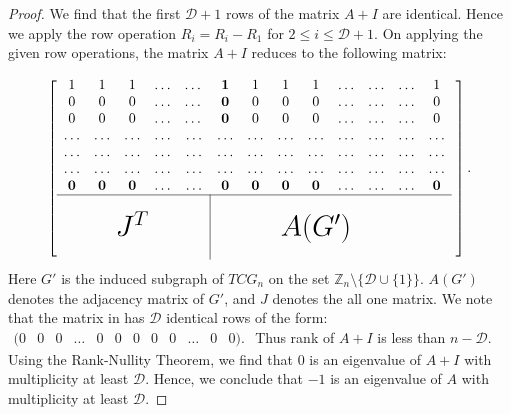 \documentclass[12pt]{article}
\begin{document}
\begin{proof}
		We find that the first $\mathcal{D}+1$ rows of the matrix $A+I$ are identical.
		Hence we apply the row operation $R_i=R_i-R_1$ for $2\le i\le \mathcal{D}+1$.
		On applying the given row operations, the matrix $A+I$ reduces to the following matrix:
		
		\begin{equation}
			\label{Eq2}
			\left[
			\begin{array}{cccccccccccccccccccccccccccccccccccccccccccccc}
				1 & 1 & 1& \ldots &\dots & \textbf{1}&1 & 1 & 1& \ldots&\ldots &\ldots& 1\\
				0 & 0 & 0& \ldots &\dots &\textbf{0}&0 & 0 & 0& \ldots &\ldots&\ldots& 0\\
				0& 0 & 0 &\ldots&\dots& \textbf{0}&0 & 0 & 0& \ldots &\ldots&\ldots& 0\\
				\ldots& \ldots &\ldots &\ldots&\ldots& \ldots &\ldots &\ldots&\ldots&\ldots&\ldots&\ldots&\ldots\\
				\ldots& \ldots &\ldots &\ldots&\ldots& \ldots &\ldots &\ldots&\ldots&\ldots&\ldots&\ldots&\ldots\\
				\ldots& \ldots &\ldots &\ldots&\ldots& \ldots &\ldots &\ldots&\ldots&\ldots&\ldots&\ldots&\ldots\\
				\textbf{0}& \textbf{0} &\textbf{0}&\ldots &\ldots& \textbf{0} &\textbf{0} & \textbf{0} & \textbf{0}& \ldots &\ldots&\ldots& \textbf{0}\\
				\cline{1-13}
				&   &                      &   & \multicolumn{1}{c|}{}  &   &                        \\
				&   & \makebox[0pt]{\huge{$J^T$}}    &   & \multicolumn{1}{c|}{}  &&   &&\makebox[0pt]{\huge{$A(G')$}}    \\
				&   &                      &   & \multicolumn{1}{c|}{}  &   &
			\end{array} \;
			\right].
		\end{equation}
		Here $G'$ is the induced subgraph of $TCG_n$ on the set $\mathbb Z_n\setminus \{\mathcal{D}\cup \{1\}\}.$ 
		$A(G')$ denotes the adjacency matrix of $G'$, and $J$ denotes the all one matrix.
		We note that the matrix in   has $\mathcal{D}$ identical rows of the form: 
		$\begin{array}{ccccccccccccccccc}
			(0 & 0 & 0 &\dots & 0 &0 &0&0&0&\dots&0 &0 ).
		\end{array}$
		Thus rank of $A+I$ is less than $n-\mathcal{D}$. Using the Rank-Nullity Theorem, we find that  $0$ is an eigenvalue of $A+I$ with multiplicity at least $\mathcal{D}$. Hence, we conclude that $-1$ is an eigenvalue of $A$ with multiplicity at least $\mathcal{D}$.
		
		
	\end{proof}
	
\end{document}

